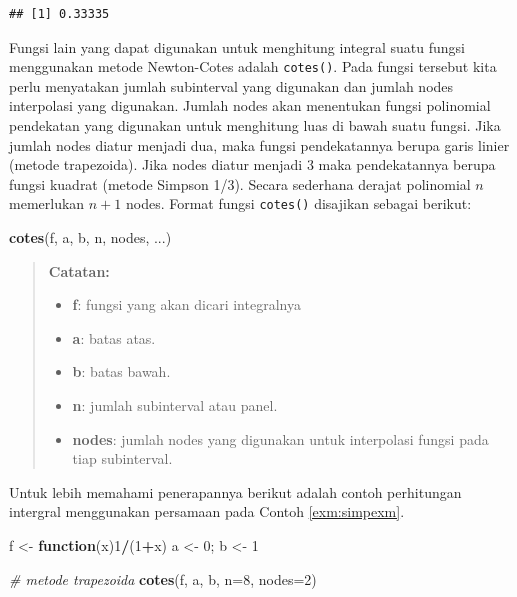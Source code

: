 \documentclass[]{book}
\newenvironment{Shaded}{\begin{snugshade}}{\end{snugshade}}
\newcommand{\CommentTok}[1]{\textcolor[rgb]{0.56,0.35,0.01}{\textit{#1}}}
\newcommand{\ControlFlowTok}[1]{\textcolor[rgb]{0.13,0.29,0.53}{\textbf{#1}}}
\newcommand{\DataTypeTok}[1]{\textcolor[rgb]{0.13,0.29,0.53}{#1}}
\newcommand{\DecValTok}[1]{\textcolor[rgb]{0.00,0.00,0.81}{#1}}
\newcommand{\KeywordTok}[1]{\textcolor[rgb]{0.13,0.29,0.53}{\textbf{#1}}}
\newcommand{\NormalTok}[1]{#1}
\newcommand{\OperatorTok}[1]{\textcolor[rgb]{0.81,0.36,0.00}{\textbf{#1}}}
\newcommand{\StringTok}[1]{\textcolor[rgb]{0.31,0.60,0.02}{#1}}
\providecommand{\tightlist}{%
  \setlength{\itemsep}{0pt}\setlength{\parskip}{0pt}}
\theoremstyle{definition}
\theoremstyle{definition}
\theoremstyle{definition}
\theoremstyle{remark}
\begin{document}
\begin{verbatim}
## [1] 0.33335
\end{verbatim}

Fungsi lain yang dapat digunakan untuk menghitung integral suatu fungsi menggunakan metode Newton-Cotes adalah \texttt{cotes()}. Pada fungsi tersebut kita perlu menyatakan jumlah subinterval yang digunakan dan jumlah nodes interpolasi yang digunakan. Jumlah nodes akan menentukan fungsi polinomial pendekatan yang digunakan untuk menghitung luas di bawah suatu fungsi. Jika jumlah nodes diatur menjadi dua, maka fungsi pendekatannya berupa garis linier (metode trapezoida). Jika nodes diatur menjadi 3 maka pendekatannya berupa fungsi kuadrat (metode Simpson 1/3). Secara sederhana derajat polinomial \(n\) memerlukan \(n+1\) nodes. Format fungsi \texttt{cotes()} disajikan sebagai berikut:

\begin{Shaded}
\begin{Highlighting}[]
\KeywordTok{cotes}\NormalTok{(f, a, b, n, nodes, ...)}
\end{Highlighting}
\end{Shaded}

\begin{quote}
\textbf{Catatan:}

\begin{itemize}
\tightlist
\item
  \textbf{f}: fungsi yang akan dicari integralnya
\item
  \textbf{a}: batas atas.
\item
  \textbf{b}: batas bawah.
\item
  \textbf{n}: jumlah subinterval atau panel.
\item
  \textbf{nodes}: jumlah nodes yang digunakan untuk interpolasi fungsi pada tiap subinterval.
\end{itemize}
\end{quote}

Untuk lebih memahami penerapannya berikut adalah contoh perhitungan intergral menggunakan persamaan pada Contoh \ref{exm:simpexm}.

\begin{Shaded}
\begin{Highlighting}[]
\NormalTok{f <-}\StringTok{ }\ControlFlowTok{function}\NormalTok{(x)}\DecValTok{1}\OperatorTok{/}\NormalTok{(}\DecValTok{1}\OperatorTok{+}\NormalTok{x)}
\NormalTok{a <-}\StringTok{ }\DecValTok{0}\NormalTok{; b <-}\StringTok{ }\DecValTok{1}

\CommentTok{# metode trapezoida}
\KeywordTok{cotes}\NormalTok{(f, a, b, }\DataTypeTok{n=}\DecValTok{8}\NormalTok{, }\DataTypeTok{nodes=}\DecValTok{2}\NormalTok{)}
\end{Highlighting}
\end{Shaded}
\end{document}
